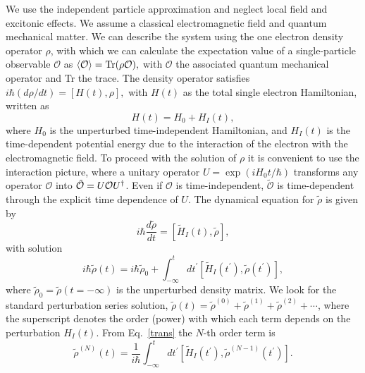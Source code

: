 \documentclass[floatfix,prb,aps,superscriptaddress,11pt,preprint,letterpaper]{revtex4}
\begin{document}
We use the independent particle approximation and neglect local field
and excitonic effects{\color{red}. We assume a classical} electromagnetic field
{\color{red} and quantum mechanical matter.}
We can describe the system using 
the one electron density
operator ${\rho}$, with which we can calculate the expectation value of a
single-particle observable $\mathcal{O}$ as 
$\langle{\cal O}\rangle=\mbox{Tr}({\rho} {\cal O}),  
\label{calo}$
with $\mathcal{O}$ the associated quantum mechanical operator and Tr
the trace. 
The density operator satisfies
$
i\hbar (d{\rho}/dt)=[H(t),{\rho}],  
\label{rho}
$
with $H(t)$ as the total single electron Hamiltonian, written as 
\begin{equation*}
H(t)=H_{0}+H_{I}(t),  
\label{ache}
\end{equation*}
where $H_{0}$ is the unperturbed time-independent Hamiltonian, and $H_{I}(t)$
is the time-dependent potential energy due to the interaction of the
electron with the electromagnetic field.
To proceed with the solution of $\rho$  it is convenient to use the
interaction picture, where a unitary operator $U=\exp ({iH_{0}t/\hbar })$
transforms any operator $\mathcal{O}$ into 
$\tilde{\mathcal{O}}=U{\cal O}U^{\dagger }$. Even if $\mathcal{O}$ 
{\color{red} is time-independent}, 
$\tilde{\mathcal{O}}$ {\color{red} is time-dependent} through the explicit
time dependence of $U$. 
The dynamical 
equation for $\tilde{\rho}$ is 
given by
\begin{equation*}
i\hbar \frac{d\tilde{{\rho}}}{dt}=[\tilde{H}_{I}(t),\tilde{{\rho}}],  
\label{rho1}
\end{equation*}
with solution 
\begin{equation}
i\hbar \tilde{{\rho}}(t)=i\hbar \tilde{{\rho}}_{0}+\int_{-\infty }^{t}dt^{\prime }[
\tilde{H}_{I}(t^{\prime }),\tilde{\rho}(t^{\prime })],  
\label{trans}
\end{equation}
where $\tilde{\rho}_{0}=\tilde{\rho}(t=-\infty )$ is the unperturbed density matrix. We look
for the standard perturbation series solution, 
$\tilde{\rho}(t)=\tilde{\rho}^{(0)}+\tilde{\rho}^{(1)}+\tilde{\rho}^{(2)}+\cdots$,  
where the superscript denotes the order (power) with which each term depends
on the perturbation $H_{I}(t)$. From Eq.~\eqref{trans} the $N$-th order
term is 
\begin{equation}
\tilde{{\rho}}^{(N)}(t)=\frac{1}{i\hbar }\int_{-\infty }^{t}dt^{\prime }[\tilde{
H}_{I}(t^{\prime }),\tilde{\rho}^{(N-1)}(t^{\prime })].  
\label{rhop}
\end{equation}
\end{document}
